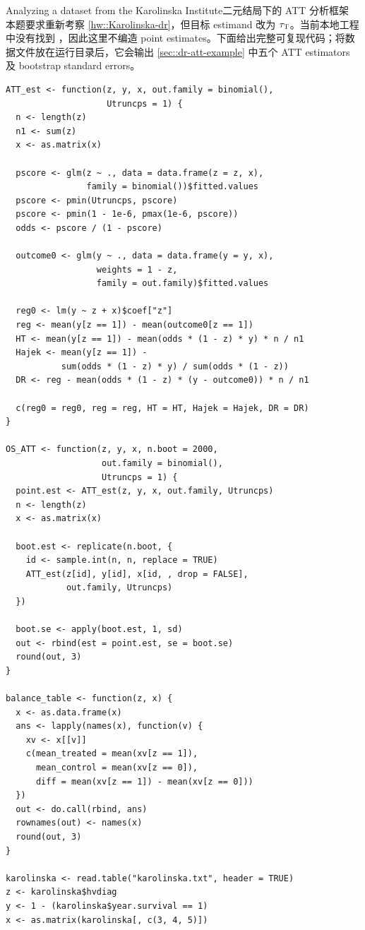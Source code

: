 \begin{exercisesolution}{Analyzing a dataset from the Karolinska Institute}{二元结局下的 ATT 分析框架}
本题要求重新考察 \cref{hw::Karolinska-dr}，但目标 estimand 改为 $\tau_\textsc{T}$。当前本地工程中没有找到 ，因此这里不编造 point estimates。下面给出完整可复现代码；将数据文件放在运行目录后，它会输出 \cref{sec::dr-att-example} 中五个 ATT estimators 及 bootstrap standard errors。

\begin{lstlisting}
ATT_est <- function(z, y, x, out.family = binomial(),
                    Utruncps = 1) {
  n <- length(z)
  n1 <- sum(z)
  x <- as.matrix(x)

  pscore <- glm(z ~ ., data = data.frame(z = z, x),
                family = binomial())$fitted.values
  pscore <- pmin(Utruncps, pscore)
  pscore <- pmin(1 - 1e-6, pmax(1e-6, pscore))
  odds <- pscore / (1 - pscore)

  outcome0 <- glm(y ~ ., data = data.frame(y = y, x),
                  weights = 1 - z,
                  family = out.family)$fitted.values

  reg0 <- lm(y ~ z + x)$coef["z"]
  reg <- mean(y[z == 1]) - mean(outcome0[z == 1])
  HT <- mean(y[z == 1]) - mean(odds * (1 - z) * y) * n / n1
  Hajek <- mean(y[z == 1]) -
           sum(odds * (1 - z) * y) / sum(odds * (1 - z))
  DR <- reg - mean(odds * (1 - z) * (y - outcome0)) * n / n1

  c(reg0 = reg0, reg = reg, HT = HT, Hajek = Hajek, DR = DR)
}

OS_ATT <- function(z, y, x, n.boot = 2000,
                   out.family = binomial(),
                   Utruncps = 1) {
  point.est <- ATT_est(z, y, x, out.family, Utruncps)
  n <- length(z)
  x <- as.matrix(x)

  boot.est <- replicate(n.boot, {
    id <- sample.int(n, n, replace = TRUE)
    ATT_est(z[id], y[id], x[id, , drop = FALSE],
            out.family, Utruncps)
  })

  boot.se <- apply(boot.est, 1, sd)
  out <- rbind(est = point.est, se = boot.se)
  round(out, 3)
}

balance_table <- function(z, x) {
  x <- as.data.frame(x)
  ans <- lapply(names(x), function(v) {
    xv <- x[[v]]
    c(mean_treated = mean(xv[z == 1]),
      mean_control = mean(xv[z == 0]),
      diff = mean(xv[z == 1]) - mean(xv[z == 0]))
  })
  out <- do.call(rbind, ans)
  rownames(out) <- names(x)
  round(out, 3)
}

karolinska <- read.table("karolinska.txt", header = TRUE)
z <- karolinska$hvdiag
y <- 1 - (karolinska$year.survival == 1)
x <- as.matrix(karolinska[, c(3, 4, 5)])


\end{lstlisting}
\end{exercisesolution}
